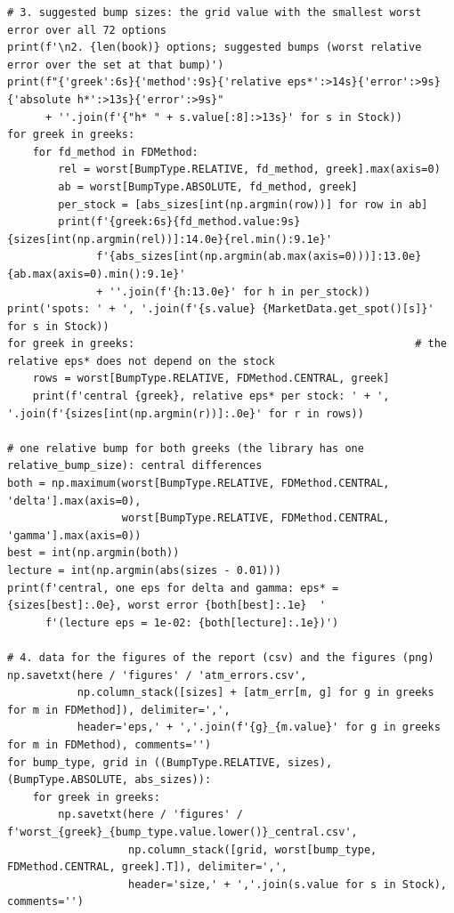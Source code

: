 \documentclass[11pt,a4paper]{article}
\begin{document}
\begin{lstlisting}[style=pysmall]
# 3. suggested bump sizes: the grid value with the smallest worst error over all 72 options
print(f'\n2. {len(book)} options; suggested bumps (worst relative error over the set at that bump)')
print(f"{'greek':6s}{'method':9s}{'relative eps*':>14s}{'error':>9s}{'absolute h*':>13s}{'error':>9s}"
      + ''.join(f'{"h* " + s.value[:8]:>13s}' for s in Stock))
for greek in greeks:
    for fd_method in FDMethod:
        rel = worst[BumpType.RELATIVE, fd_method, greek].max(axis=0)
        ab = worst[BumpType.ABSOLUTE, fd_method, greek]
        per_stock = [abs_sizes[int(np.argmin(row))] for row in ab]
        print(f'{greek:6s}{fd_method.value:9s}{sizes[int(np.argmin(rel))]:14.0e}{rel.min():9.1e}'
              f'{abs_sizes[int(np.argmin(ab.max(axis=0)))]:13.0e}{ab.max(axis=0).min():9.1e}'
              + ''.join(f'{h:13.0e}' for h in per_stock))
print('spots: ' + ', '.join(f'{s.value} {MarketData.get_spot()[s]}' for s in Stock))
for greek in greeks:                                            # the relative eps* does not depend on the stock
    rows = worst[BumpType.RELATIVE, FDMethod.CENTRAL, greek]
    print(f'central {greek}, relative eps* per stock: ' + ', '.join(f'{sizes[int(np.argmin(r))]:.0e}' for r in rows))

# one relative bump for both greeks (the library has one relative_bump_size): central differences
both = np.maximum(worst[BumpType.RELATIVE, FDMethod.CENTRAL, 'delta'].max(axis=0),
                  worst[BumpType.RELATIVE, FDMethod.CENTRAL, 'gamma'].max(axis=0))
best = int(np.argmin(both))
lecture = int(np.argmin(abs(sizes - 0.01)))
print(f'central, one eps for delta and gamma: eps* = {sizes[best]:.0e}, worst error {both[best]:.1e}  '
      f'(lecture eps = 1e-02: {both[lecture]:.1e})')

# 4. data for the figures of the report (csv) and the figures (png)
np.savetxt(here / 'figures' / 'atm_errors.csv',
           np.column_stack([sizes] + [atm_err[m, g] for g in greeks for m in FDMethod]), delimiter=',',
           header='eps,' + ','.join(f'{g}_{m.value}' for g in greeks for m in FDMethod), comments='')
for bump_type, grid in ((BumpType.RELATIVE, sizes), (BumpType.ABSOLUTE, abs_sizes)):
    for greek in greeks:
        np.savetxt(here / 'figures' / f'worst_{greek}_{bump_type.value.lower()}_central.csv',
                   np.column_stack([grid, worst[bump_type, FDMethod.CENTRAL, greek].T]), delimiter=',',
                   header='size,' + ','.join(s.value for s in Stock), comments='')


\end{lstlisting}
\end{document}
